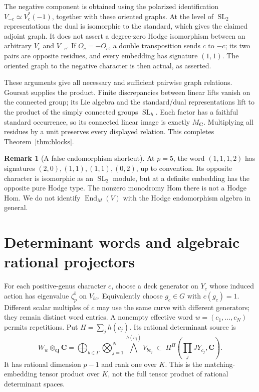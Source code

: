 \documentclass[11pt]{article}
\theoremstyle{definition}
\newtheorem{remark}[theorem]{Remark}
\newcommand{\Q}{\mathbf Q}
\newcommand{\C}{\mathbf C}
\newcommand{\SL}{\operatorname{SL}}
\newcommand{\End}{\operatorname{End}}
\begin{document}
The negative component is obtained using the polarized identification
$V_{-c}\simeq V_c^*(-1)$, together with these oriented graphs. At the
level of $\SL_2$ representations the dual is isomorphic to the standard,
which gives the claimed adjoint graph. It does not assert a degree-zero
Hodge isomorphism between an arbitrary $V_c$ and $V_{-c}$.
If $O_c=-O_c$, a double transposition sends $c$ to $-c$; its two pairs
are opposite residues, and every embedding has signature $(1,1)$. The
oriented graph to the negative character is then actual, as asserted.

These arguments give all necessary and sufficient pairwise graph relations.
Goursat supplies the product. Finite discrepancies between linear lifts
vanish on the connected group; its Lie algebra and the standard/dual
representations lift to the product of the simply connected groups
$\SL_h$. Each factor has a faithful standard occurrence, so its connected
linear image is exactly $M_\C$. Multiplying all residues by a unit
preserves every displayed relation. This completes
Theorem~\ref{thm:blocks}.

\begin{remark}[A false endomorphism shortcut]\label{rem:false}
At $p=5$, the word $(1,1,1,2)$ has signatures $(2,0),(1,1),(1,1),(0,2)$,
up to convention. Its opposite character is isomorphic as an $\SL_2$
module, but at a definite embedding has the opposite pure Hodge type.
The nonzero monodromy Hom there is not a Hodge Hom. We do not identify
$\End_M(V)$ with the Hodge endomorphism algebra in general.
\end{remark}

\section{Determinant words and algebraic rational projectors}\label{sec:words}
For each positive-genus character $c$, choose a deck generator on $Y_c$
whose induced action has eigenvalue $\zeta_p^b$ on $V_{bc}$. Equivalently
choose $g_c\in G$ with $c(g_c)=1$. Different scalar multiples of $c$
may use the same curve with different generators; they remain distinct
word entries. A nonempty effective word $w=(c_1,\ldots,c_N)$ permits
repetitions. Put $H=\sum_j h(c_j)$. Its rational determinant source is
\begin{equation}\label{eq:word}
 W_w\otimes_\Q\C=
 \bigoplus_{b\in\Gamma}\bigotimes_{j=1}^N
                \bigwedge^{h(c_j)}V_{bc_j}
 \ \subset\ H^H\left(\prod_j JY_{c_j},\C\right).
\end{equation}
It has rational dimension $p-1$ and rank one over $K$. This is the
matching-embedding tensor product over $K$, not the full tensor product
of rational determinant spaces.
\end{document}
